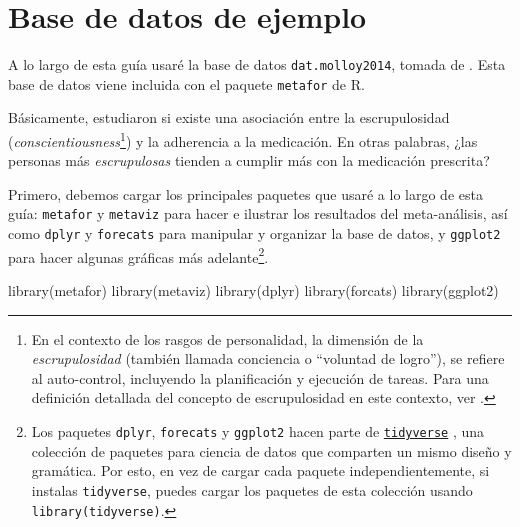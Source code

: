 \documentclass[
  bookmarksnumbered]{article}
\newenvironment{Shaded}{\begin{snugshade}}{\end{snugshade}}
\newcommand{\FunctionTok}[1]{\textcolor[rgb]{0.39,0.29,0.61}{#1}}
\newcommand{\NormalTok}[1]{\textcolor[rgb]{0.12,0.11,0.11}{#1}}
\begin{document}
\hypertarget{base-de-datos-de-ejemplo}{%
\section{Base de datos de ejemplo}\label{base-de-datos-de-ejemplo}}

A lo largo de esta guía usaré la base de datos \texttt{dat.molloy2014}, tomada de \textcite{molloy2014}. Esta base de datos viene incluida con el paquete \texttt{metafor} de R.

Básicamente, \textcite{molloy2014} estudiaron si existe una asociación entre la escrupulosidad (\emph{conscientiousness}\footnote{En el contexto de los rasgos de personalidad, la dimensión de la \emph{escrupulosidad} (también llamada conciencia o ``voluntad de logro''), se refiere al auto-control, incluyendo la planificación y ejecución de tareas. Para una definición detallada del concepto de escrupulosidad en este contexto, ver \textcite{johnBigFiveTrait1999}.}) y la adherencia a la medicación. En otras palabras, ¿las personas más \emph{escrupulosas} tienden a cumplir más con la medicación prescrita?

Primero, debemos cargar los principales paquetes que usaré a lo largo de esta guía: \texttt{metafor} \autocite{viechtbauer2010} y \texttt{metaviz} \autocite{KossmeierMetaviz} para hacer e ilustrar los resultados del meta-análisis, así como \texttt{dplyr} \autocite{WickhamDplyr2021} y \texttt{forecats} \autocite{Wickhamforcats2022} para manipular y organizar la base de datos, y \texttt{ggplot2} \autocite{Wickhamggplot22016} para hacer algunas gráficas más adelante\footnote{Los paquetes \texttt{dplyr}, \texttt{forecats} y \texttt{ggplot2} hacen parte de \href{https://www.tidyverse.org/}{\texttt{tidyverse}} \autocite{Wickhamtidyverse2019}, una colección de paquetes para ciencia de datos que comparten un mismo diseño y gramática. Por esto, en vez de cargar cada paquete independientemente, si instalas \texttt{tidyverse}, puedes cargar los paquetes de esta colección usando \texttt{library(tidyverse)}.}.

\begin{Shaded}
\begin{Highlighting}[]
\FunctionTok{library}\NormalTok{(metafor)}
\FunctionTok{library}\NormalTok{(metaviz)}
\FunctionTok{library}\NormalTok{(dplyr)}
\FunctionTok{library}\NormalTok{(forcats)}
\FunctionTok{library}\NormalTok{(ggplot2)}
\end{Highlighting}
\end{Shaded}
\end{document}

